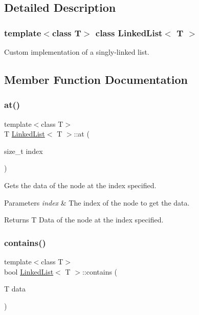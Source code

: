 \subsection{Detailed Description}
\subsubsection*{template$<$class T$>$\newline
class Linked\+List$<$ T $>$}

Custom implementation of a singly-\/linked list. 

\subsection{Member Function Documentation}
\mbox{\label{classLinkedList_a2793ba03677f44075c0529dffe0b0d5a}} 
\subsubsection{\texorpdfstring{at()}{at()}}
{\footnotesize\ttfamily template$<$class T$>$ \\
T \hyperlink{classLinkedList}{Linked\+List}$<$ T $>$\+::at (\begin{DoxyParamCaption}\item[{size\+\_\+t}]{index }\end{DoxyParamCaption})\hspace{0.3cm}{\ttfamily [inline]}}



Gets the data of the node at the index specified. 


\begin{DoxyParams}{Parameters}
{\em index} & The index of the node to get the data.\\
\hline
\end{DoxyParams}
\begin{DoxyReturn}{Returns}
T Data of the node at the index specified. 
\end{DoxyReturn}
\mbox{\label{classLinkedList_a603e1c5a0a4528d82f83b9393f83bf22}} 
\subsubsection{\texorpdfstring{contains()}{contains()}}
{\footnotesize\ttfamily template$<$class T$>$ \\
bool \hyperlink{classLinkedList}{Linked\+List}$<$ T $>$\+::contains (\begin{DoxyParamCaption}\item[{T}]{data }\end{DoxyParamCaption})\hspace{0.3cm}{\ttfamily [inline]}}



